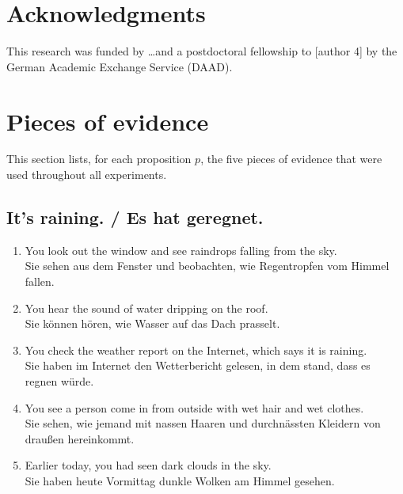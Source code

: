 \documentclass[11pt]{article}
\begin{document}
\section*{Acknowledgments}
This research was funded by \dots and a postdoctoral fellowship to [author 4] by the German Academic Exchange Service (DAAD).


   



\appendix

\section{Pieces of evidence}
\label{sec:evidence}

This section lists, for each proposition $p$, the five pieces of evidence that were used throughout all experiments.

\subsection{It's raining. / Es hat geregnet.}

\begin{enumerate}
	\item You look out the window and see raindrops falling from the sky. \\ Sie sehen aus dem Fenster und beobachten, wie Regentropfen vom Himmel fallen. 
	\item You hear the sound of water dripping on the roof. \\ Sie können hören, wie Wasser auf das Dach prasselt.
	\item You check the weather report on the Internet, which says it is raining. \\ Sie haben im Internet den Wetterbericht gelesen, in dem stand, dass es regnen würde. 
	\item You see a person come in from outside with wet hair and wet clothes. \\ Sie sehen, wie jemand mit nassen Haaren und durchnässten Kleidern von draußen hereinkommt.
	\item Earlier today, you had seen dark clouds in the sky. \\ Sie haben heute Vormittag dunkle Wolken am Himmel gesehen.
\end{enumerate}
\end{document}
